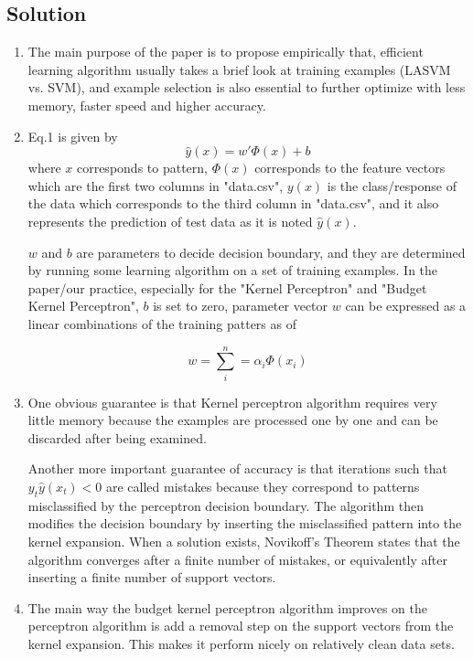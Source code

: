 \documentclass[submit]{harvardml}
\begin{document}
\subsection*{Solution}

\begin{enumerate}
  \item The main purpose of the paper is to propose empirically that, efficient learning algorithm usually takes a brief look at training examples (LASVM vs. SVM), and example selection is also essential to further optimize with less memory, faster speed and higher accuracy.
  
  \item Eq.1 is given by
  $$ \hat y(x) = w' \Phi(x) + b $$
  where $x$ corresponds to pattern, $\Phi(x)$ corresponds to the feature vectors which are the first two columns in "data.csv", $y(x)$ is the class/response of the data which corresponds to the third column in "data.csv", and it also represents the prediction of test data as it is noted $\hat y(x)$. 
  
  $w$ and $b$ are parameters to decide decision boundary, and they are determined by running some learning algorithm on a set of training examples. In the paper/our practice, especially for the "Kernel Perceptron" and "Budget Kernel Perceptron", $b$ is set to zero, parameter vector $w$ can be expressed as a linear combinations of the training patters as of
  
  $$ w = \sum_i^n = \alpha_i \Phi(x_i) $$ 
  
  \item One obvious guarantee is that Kernel perceptron algorithm requires very little memory because the examples are processed one by one and can be discarded after being examined.
  
  Another more important guarantee of accuracy is that iterations such that $y_t\hat y(x_t) < 0$ are called mistakes because they correspond to patterns misclassified by the perceptron decision boundary. The algorithm then modifies the decision boundary by inserting the misclassified pattern into the kernel expansion. When a solution exists, Novikoff’s Theorem states that the algorithm converges after a finite number of mistakes, or equivalently after inserting a finite number of support vectors.
  
  \item The main way the budget kernel perceptron algorithm improves on the perceptron algorithm is add a removal step on the support vectors from the kernel expansion. This makes it perform nicely on relatively clean data sets.
  

\end{enumerate}
\end{document}
